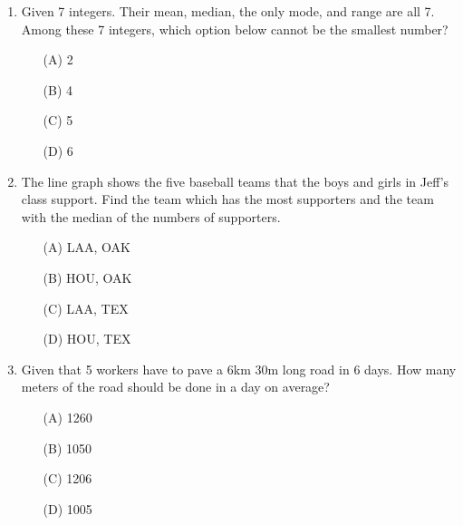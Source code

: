 \documentclass[11pt]{scrartcl}
\begin{document}
\begin{enumerate}
    \item Given 7 integers. Their mean, median, the only mode, and range are all 7. Among these 7 integers, which option below cannot be the smallest number?


    \begin{enumerate}
        \item[(A)] 2
        \item[(B)] 4
        \item[(C)] 5
        \item[(D)] 6
    \end{enumerate}
\vspace{4\baselineskip}

        \item The line graph shows the five baseball teams that the boys and girls in Jeff's class support. Find the team which has the most supporters and the team with the median of the numbers of supporters.

    \begin{center}
    \end{center}

    \begin{enumerate}
        \item[(A)] LAA, OAK
        \item[(B)] HOU, OAK
        \item[(C)] LAA, TEX
        \item[(D)] HOU, TEX
    \end{enumerate}
    \vspace{4\baselineskip}


    \item Given that 5 workers have to pave a 6km 30m long road in 6 days. How many meters of the road should be done in a day on average?
    \begin{enumerate}
        \item[(A)] 1260
        \item[(B)] 1050
        \item[(C)] 1206
        \item[(D)] 1005
    \end{enumerate}
    \vspace{4\baselineskip}



\end{enumerate}
\end{document}
